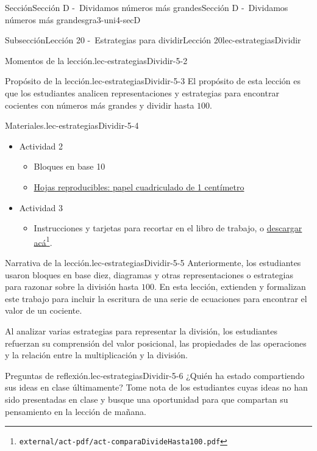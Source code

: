 \documentclass[oneside,10pt,]{article}
\begin{document}
\begin{sectionptx}{Sección}{Sección D -~Dividamos números más grandes}{}{Sección D -~Dividamos números más grandes}{}{}{gra3-uni4-secD}
\begin{subsectionptx}{Subsección}{Lección 20 -~Estrategias para dividir}{}{Lección 20}{}{}{lec-estrategiasDividir}
\begin{introduction}{}
\begin{paragraphs}{Momentos de la lección.}{lec-estrategiasDividir-5-2}
\end{paragraphs}%
\begin{paragraphs}{Propósito de la lección.}{lec-estrategiasDividir-5-3}%
El propósito de esta lección es que los estudiantes analicen representaciones y estrategias para encontrar cocientes con números más grandes y dividir hasta \(100\).%
\end{paragraphs}%
\begin{paragraphs}{Materiales.}{lec-estrategiasDividir-5-4}%
%
\begin{itemize}[label=\textbullet]
\item{}Actividad 2%
%
\begin{itemize}[label=$\circ$]
\item{}Bloques en base 10%
\item{}\hyperref[blm-papelCuadriculadoCentimetro]{Hojas reproducibles: papel cuadriculado de 1 centímetro}%
\end{itemize}
\item{}Actividad 3%
%
\begin{itemize}[label=$\circ$]
\item{}Instrucciones y tarjetas para recortar en el libro de trabajo, o \href{external/act-pdf/act-comparaDivideHasta100.pdf}{descargar acá}\footnote{\nolinkurl{external/act-pdf/act-comparaDivideHasta100.pdf}\label{lec-estrategiasDividir-5-4-2-2-2-1-2}}.%
\end{itemize}
\end{itemize}
\end{paragraphs}%
\begin{paragraphs}{Narrativa de la lección.}{lec-estrategiasDividir-5-5}%
Anteriormente, los estudiantes usaron bloques en base diez, diagramas y otras representaciones o estrategias para razonar sobre la división hasta \(100\). En esta lección, extienden y formalizan este trabajo para incluir la escritura de una serie de ecuaciones para encontrar el valor de un cociente.%
\par
Al analizar varias estrategias para representar la división, los estudiantes refuerzan su comprensión del valor posicional, las propiedades de las operaciones y la relación entre la multiplicación y la división.%
\end{paragraphs}%
\begin{paragraphs}{Preguntas de reflexión.}{lec-estrategiasDividir-5-6}%
¿Quién ha estado compartiendo sus ideas en clase últimamente? Tome nota de los estudiantes cuyas ideas no han sido presentadas en clase y busque una oportunidad para que compartan su pensamiento en la lección de mañana.%

\end{paragraphs}
\end{introduction}
\end{subsectionptx}
\end{sectionptx}
\end{document}
